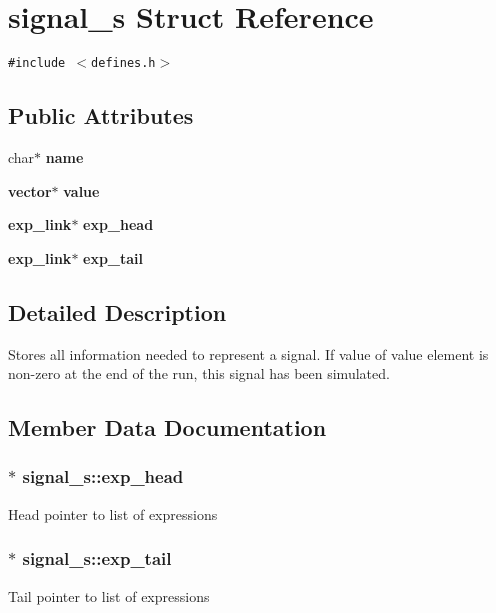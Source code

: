 \section{signal\_\-s  Struct Reference}
\label{structsignal__s}
{\tt \#include $<$defines.h$>$}

\subsection*{Public Attributes}
\begin{CompactItemize}
\item 
char$\ast$ {\bf name}
\item 
{\bf vector}$\ast$ {\bf value}
\item 
{\bf exp\_\-link}$\ast$ {\bf exp\_\-head}
\item 
{\bf exp\_\-link}$\ast$ {\bf exp\_\-tail}
\end{CompactItemize}


\subsection{Detailed Description}
Stores all information needed to represent a signal. If value of value element is non-zero at the end of the run, this signal has been simulated. 



\subsection{Member Data Documentation}
\subsubsection{ $\ast$ signal\_\-s::exp\_\-head}\label{structsignal__s_m2}


Head pointer to list of expressions 
\subsubsection{ $\ast$ signal\_\-s::exp\_\-tail}\label{structsignal__s_m3}


Tail pointer to list of expressions 
